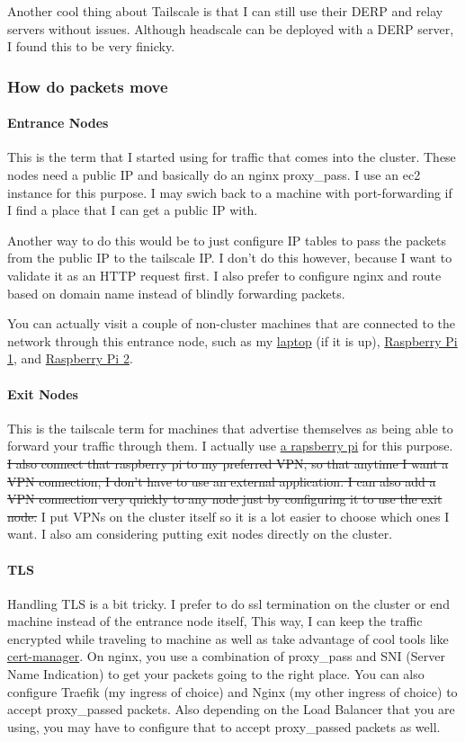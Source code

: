 \documentclass[12pt]{article}
\begin{document}
Another cool thing about Tailscale is that I can still use their DERP and relay servers without issues. Although headscale can be deployed with a DERP server, I found this to be very finicky.

\subsubsection{How do packets move}
\paragraph{Entrance Nodes}
This is the term that I started using for traffic that comes into the cluster. These nodes need a public IP and basically do an nginx proxy\_pass. I use an ec2 instance for this purpose. I may swich back to a machine with port-forwarding if I find a place that I can get a public IP with.

Another way to do this would be to just configure IP tables to pass the packets from the public IP to the tailscale IP. I don't do this however, because I want to validate it as an HTTP request first. I also prefer to configure nginx and route based on domain name instead of blindly forwarding packets.

You can actually visit a couple of non-cluster machines that are connected to the network through this entrance node, such as my \href{https://computer.sachiniyer.com}{laptop} (if it is up), \href{https://coffeesociety.sachiniyer.com}{Raspberry Pi 1}, and \href{https://playground.sachiniyer.com}{Raspberry Pi 2}.

\paragraph{Exit Nodes}
This is the tailscale term for machines that advertise themselves as being able to forward your traffic through them. I actually use \href{https://playground.sachiniyer.com}{a rapsberry pi} for this purpose. \sout{I also connect that raspberry pi to my preferred VPN, so that anytime I want a VPN connection, I don't have to use an external application. I can also add a VPN connection very quickly to any node just by configuring it to use the exit node.} I put VPNs on the cluster itself so it is a lot easier to choose which ones I want. I also am considering putting exit nodes directly on the cluster.

\paragraph{TLS}
Handling TLS is a bit tricky. I prefer to do ssl termination on the cluster or end machine instead of the entrance node itself, This way, I can keep the traffic encrypted while traveling to machine as well as take advantage of cool tools like \href{https://cert-manager.io/}{cert-manager}. On nginx, you use a combination of proxy\_pass and SNI (Server Name Indication) to get your packets going to the right place. You can also configure Traefik (my ingress of choice) and Nginx (my other ingress of choice) to accept proxy\_passed packets. Also depending on the Load Balancer that you are using, you may have to configure that to accept proxy\_passed packets as well.
\end{document}
